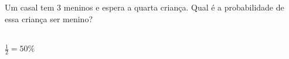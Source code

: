 \begin{ex}
Um casal tem 3 meninos e espera a quarta criança. Qual é a probabilidade de essa criança ser menino?
  \begin{sol}
   \phantom{A} \\
   $\frac{1}{2}=50\%$
  \end{sol}
\end{ex}